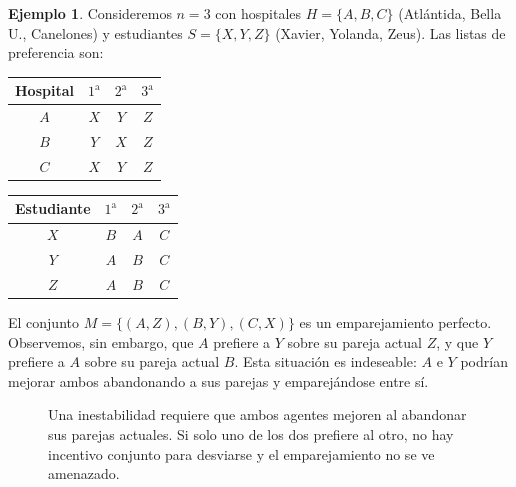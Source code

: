 \documentclass[12pt, spanish, oneside, openany]{book}
\theoremstyle{uprightplain}
\theoremstyle{definition}
\newtheorem{ejemplo}[teorema]{Ejemplo}
\theoremstyle{remark}
\theoremstyle{definition}
\begin{document}
\begin{ejemplo}
\label{ej:basico}
Consideremos $n=3$ con hospitales $H=\{A,B,C\}$ (Atlántida, Bella U., Canelones) y estudiantes $S=\{X,Y,Z\}$ (Xavier, Yolanda, Zeus). Las listas de preferencia son:

\begin{center}
\begin{tabular}{c|ccc}
\toprule
Hospital & $1^\text{a}$ & $2^\text{a}$ & $3^\text{a}$ \\
\midrule
$A$ & $X$ & $Y$ & $Z$ \\
$B$ & $Y$ & $X$ & $Z$ \\
$C$ & $X$ & $Y$ & $Z$ \\
\bottomrule
\end{tabular}
\qquad
\begin{tabular}{c|ccc}
\toprule
Estudiante & $1^\text{a}$ & $2^\text{a}$ & $3^\text{a}$ \\
\midrule
$X$ & $B$ & $A$ & $C$ \\
$Y$ & $A$ & $B$ & $C$ \\
$Z$ & $A$ & $B$ & $C$ \\
\bottomrule
\end{tabular}
\end{center}

El conjunto $M=\{(A,Z),(B,Y),(C,X)\}$ es un emparejamiento perfecto. Observemos, sin embargo, que $A$ prefiere a $Y$ sobre su pareja actual $Z$, y que $Y$ prefiere a $A$ sobre su pareja actual $B$. Esta situación es indeseable: $A$ e $Y$ podrían mejorar ambos abandonando a sus parejas y emparejándose entre sí.
\end{ejemplo}
\begin{figure}[H]
\centering
{}
\caption{Una inestabilidad requiere que ambos agentes mejoren al
abandonar sus parejas actuales. Si solo uno de los dos prefiere al otro, no
hay incentivo conjunto para desviarse y el emparejamiento no se ve
amenazado.}
\label{fig:par-inestable}
\end{figure}
\end{document}
